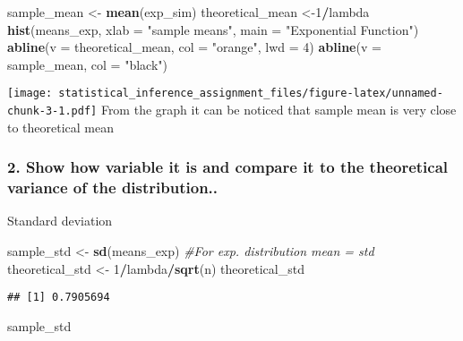 \documentclass[]{article}
\newenvironment{Shaded}{\begin{snugshade}}{\end{snugshade}}
\newcommand{\KeywordTok}[1]{\textcolor[rgb]{0.13,0.29,0.53}{\textbf{#1}}}
\newcommand{\DataTypeTok}[1]{\textcolor[rgb]{0.13,0.29,0.53}{#1}}
\newcommand{\DecValTok}[1]{\textcolor[rgb]{0.00,0.00,0.81}{#1}}
\newcommand{\StringTok}[1]{\textcolor[rgb]{0.31,0.60,0.02}{#1}}
\newcommand{\CommentTok}[1]{\textcolor[rgb]{0.56,0.35,0.01}{\textit{#1}}}
\newcommand{\OperatorTok}[1]{\textcolor[rgb]{0.81,0.36,0.00}{\textbf{#1}}}
\newcommand{\NormalTok}[1]{#1}
\begin{document}
\begin{Shaded}
\begin{Highlighting}[]
\NormalTok{sample_mean <-}\StringTok{ }\KeywordTok{mean}\NormalTok{(exp_sim)}
\NormalTok{theoretical_mean <-}\DecValTok{1}\OperatorTok{/}\NormalTok{lambda}
\KeywordTok{hist}\NormalTok{(means_exp, }\DataTypeTok{xlab =} \StringTok{"sample means"}\NormalTok{, }\DataTypeTok{main =} \StringTok{"Exponential Function"}\NormalTok{)}
\KeywordTok{abline}\NormalTok{(}\DataTypeTok{v =}\NormalTok{ theoretical_mean, }\DataTypeTok{col =} \StringTok{"orange"}\NormalTok{, }\DataTypeTok{lwd =} \DecValTok{4}\NormalTok{)}
\KeywordTok{abline}\NormalTok{(}\DataTypeTok{v =}\NormalTok{ sample_mean, }\DataTypeTok{col =} \StringTok{"black"}\NormalTok{)}
\end{Highlighting}
\end{Shaded}

\texttt{[image: statistical\_inference\_assignment\_files/figure-latex/unnamed-chunk-3-1.pdf]}
From the graph it can be noticed that sample mean is very close to
theoretical mean

\subsubsection{2. Show how variable it is and compare it to the
theoretical variance of the
distribution..}\label{show-how-variable-it-is-and-compare-it-to-the-theoretical-variance-of-the-distribution..}

Standard deviation

\begin{Shaded}
\begin{Highlighting}[]
\NormalTok{sample_std <-}\StringTok{ }\KeywordTok{sd}\NormalTok{(means_exp)}
\CommentTok{#For exp. distribution mean = std}
\NormalTok{theoretical_std <-}\StringTok{ }\DecValTok{1}\OperatorTok{/}\NormalTok{lambda}\OperatorTok{/}\KeywordTok{sqrt}\NormalTok{(n)}
\NormalTok{theoretical_std}
\end{Highlighting}
\end{Shaded}

\begin{verbatim}
## [1] 0.7905694
\end{verbatim}

\begin{Shaded}
\begin{Highlighting}[]
\NormalTok{sample_std}
\end{Highlighting}
\end{Shaded}
\end{document}
